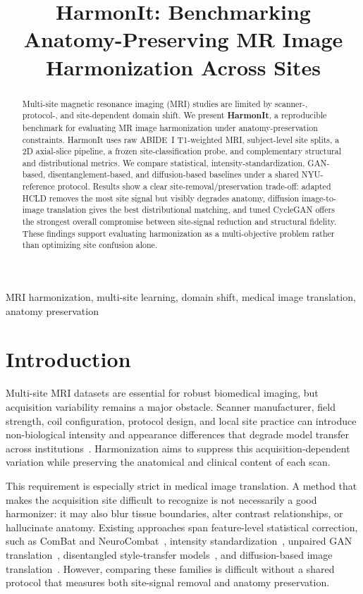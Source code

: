 \documentclass{article}
\title{HarmonIt: Benchmarking Anatomy-Preserving MR Image Harmonization Across Sites}
\begin{document}
\maketitle

\begin{abstract}
Multi-site magnetic resonance imaging (MRI) studies are limited by scanner-, protocol-, and site-dependent domain shift. We present \textbf{HarmonIt}, a reproducible benchmark for evaluating MR image harmonization under anatomy-preservation constraints. HarmonIt uses raw ABIDE~I T1-weighted MRI, subject-level site splits, a 2D axial-slice pipeline, a frozen site-classification probe, and complementary structural and distributional metrics. We compare statistical, intensity-standardization, GAN-based, disentanglement-based, and diffusion-based baselines under a shared NYU-reference protocol. Results show a clear site-removal/preservation trade-off: adapted HCLD removes the most site signal but visibly degrades anatomy, diffusion image-to-image translation gives the best distributional matching, and tuned CycleGAN offers the strongest overall compromise between site-signal reduction and structural fidelity. These findings support evaluating harmonization as a multi-objective problem rather than optimizing site confusion alone.
\end{abstract}

\begin{keywords}
MRI harmonization, multi-site learning, domain shift, medical image translation, anatomy preservation
\end{keywords}

\section{Introduction}
Multi-site MRI datasets are essential for robust biomedical imaging, but acquisition variability remains a major obstacle. Scanner manufacturer, field strength, coil configuration, protocol design, and local site practice can introduce non-biological intensity and appearance differences that degrade model transfer across institutions~\cite{fortin2018harmonization,pomponio2020harmonization}. Harmonization aims to suppress this acquisition-dependent variation while preserving the anatomical and clinical content of each scan.

This requirement is especially strict in medical image translation. A method that makes the acquisition site difficult to recognize is not necessarily a good harmonizer: it may also blur tissue boundaries, alter contrast relationships, or hallucinate anatomy. Existing approaches span feature-level statistical correction, such as ComBat and NeuroCombat~\cite{johnson2007combat,fortin2018harmonization,pomponio2020harmonization}, intensity standardization~\cite{nyul2000standardization}, unpaired GAN translation~\cite{zhu2017cyclegan,choi2018stargan}, disentangled style-transfer models~\cite{wu2025dlest}, and diffusion-based image translation~\cite{ho2020ddpm,saharia2022palette,meng2022sdedit}. However, comparing these families is difficult without a shared protocol that measures both site-signal removal and anatomy preservation.
\end{document}
